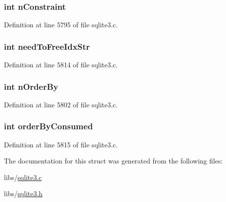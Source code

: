 \subsubsection[{n\+Constraint}]{\setlength{\rightskip}{0pt plus 5cm}int n\+Constraint}\label{structsqlite3__index__info_ad5f4adc7482c06ccd22b2a6449a8f785}


Definition at line 5795 of file sqlite3.\+c.

\hypertarget{structsqlite3__index__info_a3459b33099539c2e615729a8f773fa16}{}
\subsubsection[{need\+To\+Free\+Idx\+Str}]{\setlength{\rightskip}{0pt plus 5cm}int need\+To\+Free\+Idx\+Str}\label{structsqlite3__index__info_a3459b33099539c2e615729a8f773fa16}


Definition at line 5814 of file sqlite3.\+c.

\hypertarget{structsqlite3__index__info_a15e3c93cf5d8d7c86e94b303d48872db}{}
\subsubsection[{n\+Order\+By}]{\setlength{\rightskip}{0pt plus 5cm}int n\+Order\+By}\label{structsqlite3__index__info_a15e3c93cf5d8d7c86e94b303d48872db}


Definition at line 5802 of file sqlite3.\+c.

\hypertarget{structsqlite3__index__info_a8e78cfb50b03abaae692e669b2dc78c8}{}
\subsubsection[{order\+By\+Consumed}]{\setlength{\rightskip}{0pt plus 5cm}int order\+By\+Consumed}\label{structsqlite3__index__info_a8e78cfb50b03abaae692e669b2dc78c8}


Definition at line 5815 of file sqlite3.\+c.



The documentation for this struct was generated from the following files\+:\begin{DoxyCompactItemize}
\item 
libs/\hyperlink{sqlite3_8c}{sqlite3.\+c}\item 
libs/\hyperlink{sqlite3_8h}{sqlite3.\+h}\end{DoxyCompactItemize}
